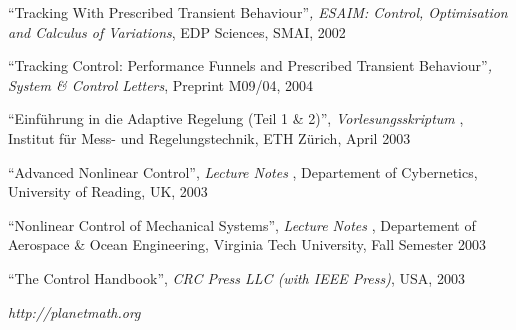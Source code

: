 \newpage

\thispagestyle{empty}



\begin{thebibliography}{1}
\foreignlanguage{english}{ {}``Tracking With Prescribed
Transient Behaviour''\emph{, ESAIM: Control, Optimisation and Calculus
of Variations}, EDP Sciences, SMAI, 2002}

\foreignlanguage{english}{ {}``Tracking Control: Performance
Funnels and Prescribed Transient Behaviour''\emph{, System \& Control
Letters}, Preprint M09/04, 2004}

\foreignlanguage{english}{ {}``Einführung in die Adaptive Regelung (Teil 1 \& 2)'',
\emph{Vorlesungsskriptum} , Institut für Mess- und Regelungstechnik,
ETH Zürich, April 2003}

\foreignlanguage{english}{ {}``Advanced Nonlinear Control'', \emph{Lecture Notes}
, Departement of Cybernetics, University of Reading, UK, 2003}

\foreignlanguage{english}{ {}``Nonlinear Control of Mechanical Systems'', \emph{Lecture
Notes} , Departement of Aerospace \& Ocean Engineering, Virginia Tech
University, Fall Semester 2003}

\foreignlanguage{english}{ {}``The Control Handbook'', \emph{CRC Press LLC (with IEEE
Press)}, USA, 2003}

\foreignlanguage{english}{
\emph{http://planetmath.org}}
\end{thebibliography}

